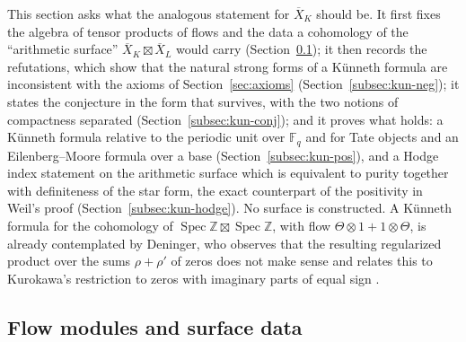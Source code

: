 \documentclass[11pt]{amsart}
\theoremstyle{plain}
\theoremstyle{definition}
\theoremstyle{remark}
\numberwithin{equation}{section}
\newcommand{\Z}{\mathbb{Z}}
\newcommand{\F}{\mathbb{F}}
\newcommand{\Xbar}{\overline{X}}
\DeclareMathOperator{\Spec}{Spec}
\begin{document}
This section asks what
the analogous statement for $\Xbar_K$ should be. It first fixes the
algebra of tensor products of flows and the data a cohomology of the
``arithmetic surface'' $\Xbar_K\boxtimes\Xbar_L$ would carry
(Section~\ref{subsec:kun-defs}); it then records the refutations, which
show that the natural strong forms of a K\"unneth formula are
inconsistent with the axioms of Section~\ref{sec:axioms}
(Section~\ref{subsec:kun-neg}); it states the conjecture in the form
that survives, with the two notions of compactness separated
(Section~\ref{subsec:kun-conj}); and it proves what holds: a K\"unneth
formula relative to the periodic unit over $\F_q$ and for Tate objects
and an Eilenberg--Moore formula over a base
(Section~\ref{subsec:kun-pos}), and a Hodge index statement on the
arithmetic surface which is equivalent to purity together with
definiteness of the star form, the exact counterpart of the positivity
in Weil's proof (Section~\ref{subsec:kun-hodge}). No surface is
constructed. A K\"unneth formula for the cohomology of
$\Spec\Z\boxtimes\Spec\Z$, with flow $\Theta\otimes1+1\otimes\Theta$,
is already contemplated by Deninger, who observes that the resulting
regularized product over the sums $\rho+\rho'$ of zeros does not make
sense and relates this to Kurokawa's restriction to zeros with
imaginary parts of equal sign \cite[(7.32), pp.~41--42]%
{Deninger1994Motivic}.

\subsection{Flow modules and surface data}\label{subsec:kun-defs}
\end{document}
